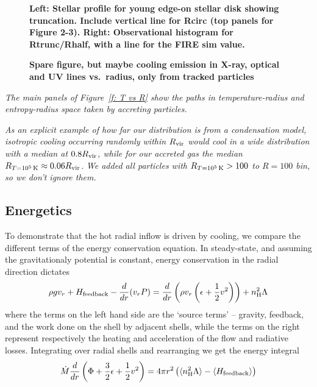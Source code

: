 \documentclass[fleqn,usenatbib]{mnras}
\newcommand{\Rcool}{R_{T=10^5\,{\rm K}}}
\newcommand{\Mdot}{\dot{M}}
\begin{document}
\begin{figure}
    \centering
    \caption{
    \textbf{
    Left:
    Stellar profile for young edge-on stellar disk showing truncation.
    Include vertical line for Rcirc (top panels for Figure 2-3).
    Right:
    Observational histogram for Rtrunc/Rhalf, with a line for the FIRE sim value.
    }
    }
    \label{f:emission}
\end{figure}

\begin{figure}
    \centering
    \caption{
    \textbf{Spare figure, but maybe
    cooling emission in X-ray, optical and UV lines vs.\ radius, only from tracked particles
    }
    }
    \label{f:emission}
\end{figure}

\textit{
The main panels of Figure~\ref{f: T vs R} show the paths in temperature-radius and entropy-radius space taken by accreting particles.
}

\textit{
As an explicit example of how far our distribution is from a condensation model, isotropic cooling occurring randomly within $R_{\rm vir}$ would cool in a wide distribution with a median at $0.8 R_{\rm vir}$, while for our accreted gas the median $\Rcool \approx 0.06 R_{\rm vir}$.
}
\textit{We added all particles with $\Rcool>100$ to $R=100$ bin, so we don't ignore them.}

\subsection{Energetics}

To demonstrate that the hot radial inflow is driven by cooling, we compare the different terms of the energy conservation equation. In steady-state, and assuming the gravitationaly potential is constant,  energy conservation in the radial direction dictates \citep[e.g.][]{Shu82}
\begin{equation}\label{e:energy}
    \rho g v_r + H_{\rm feedback} - \frac{d}{dr}(v_r P)= 
    \frac{d}{dr}\left(\rho v_r \left(\epsilon+\frac{1}{2}v^2\right)\right)  +  n_{\rm H}^2\Lambda  
\end{equation}
where the terms on the left hand side are the `source terms' -- gravity, feedback, and the work done on the shell by adjacent shells, while the terms on the right represent respectively the heating and acceleration of the flow and radiative losses. 
Integrating over radial shells and rearranging we get the energy integral
\begin{equation}
    \Mdot\frac{d}{dr}\left(\Phi+\frac{3}{2}\epsilon + \frac{1}{2}v^2\right) = 4\pi r^2 \left(\langle\nH^2\Lambda\rangle-\langle H_{\rm feedback}\rangle\right)
\end{equation}
\end{document}
